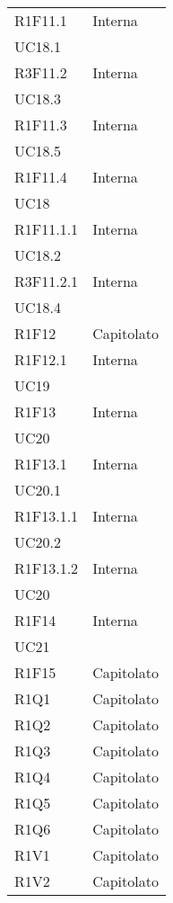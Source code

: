 \begin{longtable}{|C{6.5cm}|C{6.5cm}|}
	R1F11.1 &  \centering Interna \\ UC18.1 \tabularnewline

	R3F11.2 & \centering Interna \\ UC18.3 \tabularnewline

	R1F11.3 & \centering Interna \\ UC18.5 \tabularnewline

	R1F11.4 & \centering Interna \\ UC18 \tabularnewline

	R1F11.1.1 & \centering Interna \\ UC18.2 \tabularnewline

	R3F11.2.1 & \centering Interna \\ UC18.4 \tabularnewline

	R1F12 &   Capitolato \\

	R1F12.1 & \centering Interna \\ UC19 \tabularnewline

	R1F13 & \centering Interna \\ UC20 \tabularnewline

	R1F13.1 & \centering Interna \\ UC20.1 \tabularnewline

	R1F13.1.1 & \centering Interna \\ UC20.2 \tabularnewline

	R1F13.1.2 & \centering Interna \\ UC20 \tabularnewline

	R1F14 & \centering Interna \\ UC21 \tabularnewline

	R1F15 & Capitolato \\

	R1Q1 & Capitolato \\

	R1Q2 & Capitolato \\

	R1Q3 & Capitolato \\

	R1Q4 & Capitolato \\

	R1Q5 & Capitolato \\

	R1Q6 & Capitolato \\

	R1V1 & Capitolato \\

	R1V2 & Capitolato \\


\end{longtable}
